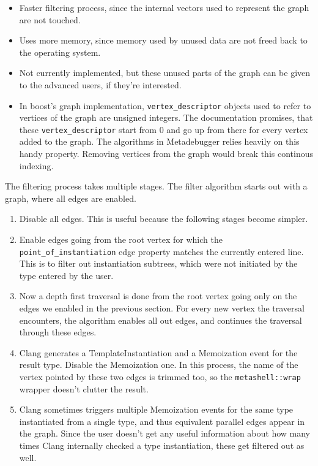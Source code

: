 \begin{itemize}
    \item
        Faster filtering process, since the internal vectors used to represent
        the graph are not touched.
    \item
        Uses more memory, since memory used by unused data are not freed back
        to the operating system.
    \item
        Not currently implemented, but these unused parts of the graph can be
        given to the advanced users, if they're interested.
    \item
        In boost's graph implementation, \lstinline|vertex_descriptor|
        objects used to refer to vertices of the graph are unsigned integers.
        The documentation promises, that these \lstinline|vertex_descriptor|
        start from 0 and go up from there for every vertex added to the graph.
        The algorithms in Metadebugger relies heavily on this handy property.
        Removing vertices from the graph would break this continous indexing.
\end{itemize}

The filtering process takes multiple stages. The filter algorithm starts out
with a graph, where all edges are enabled.

\begin{enumerate}
    \item
        Disable all edges. This is useful because the following stages become
        simpler.
    \item
        Enable edges going from the root vertex for which the
        \lstinline|point_of_instantiation| edge property matches the currently
        entered line. This is to filter out instantiation subtrees, which were
        not initiated by the type entered by the user.
    \item
        Now a depth first traversal is done from the root vertex going only on
        the edges we enabled in the previous section. For every new vertex the
        traversal encounters, the algorithm enables all out edges, and
        continues the traversal through these edges.
    \item
        Clang generates a TemplateInstantiation and a Memoization event for the
        result type. Disable the Memoization one. In this process, the name of
        the vertex pointed by these two edges is trimmed too, so the
        \lstinline|metashell::wrap| wrapper doesn't clutter the result.
    \item
        Clang sometimes triggers multiple Memoization events for the same type
        instantiated from a single type, and thus equivalent parallel edges
        appear in the graph. Since the user doesn't get any useful information
        about how many times Clang internally checked a type instantiation,
        these get filtered out as well.
\end{enumerate}

